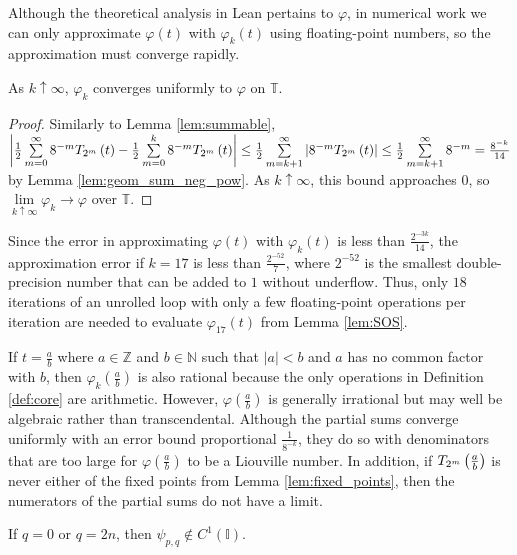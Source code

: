 Although the theoretical analysis in Lean pertains to $\varphi$, in numerical work we can only approximate $\varphi\left(t\right)$ with $\varphi_k\left(t\right)$ using floating-point numbers, so the approximation must converge rapidly.
\begin{lemma}[]
  \label{lem:limit}
  As $k \uparrow \infty$, $\varphi_k$ converges uniformly to $\varphi$ on $\mathbb{T}$.
\end{lemma}
\begin{proof}
  Similarly to Lemma \ref{lem:summable}, $\left|\halfsum{0}{\infty}{t} - \halfsum{0}{k}{t}\right| \leq \frac{1}{2} \sum\limits_{m = k + 1}^\infty \left|8^{-m}\TT[t]{m}\right| \leq \frac{1}{2} \sum\limits_{m = k + 1}^\infty 8^{-m} = \offset$ by Lemma \ref{lem:geom_sum_neg_pow}. As $k \uparrow \infty$, this bound approaches $0$, so $\lim\limits_{k \uparrow \infty}\varphi_k \rightarrow \varphi$ over $\mathbb{T}$.
\end{proof}
\begin{remark*}
Since the error in approximating $\varphi\left(t\right)$ with $\varphi_k\left(t\right)$ is less than $\frac{2^{-3k}}{14}$, the approximation error if $k = 17$ is less than $\frac{2^{-52}}{7}$, where $2^{-52}$ is the smallest double-precision number that can be added to $1$ without underflow. Thus, only $18$ iterations of an unrolled loop with only a few floating-point operations per iteration are needed to evaluate $\varphi_{17}\left(t\right)$ from Lemma \ref{lem:SOS}.
\end{remark*}
\begin{remark*}
  If $t = \frac{a}{b}$ where $a \in \mathbb{Z}$ and $b \in \mathbb{N}$ such that $\left|a\right| < b$ and $a$ has no common factor with $b$, then $\varphi_k\left(\frac{a}{b}\right)$ is also rational because the only operations in Definition \ref{def:core} are arithmetic. However, $\varphi\left(\frac{a}{b}\right)$ is generally irrational but may well be algebraic rather than transcendental. Although the partial sums converge uniformly with an error bound proportional $\frac{1}{8^{-k}}$, they do so with denominators that are too large for $\varphi\left(\frac{a}{b}\right)$ to be a Liouville number. In addition, if $\TT[\frac{a}{b}]{m}$ is never either of the fixed points from Lemma \ref{lem:fixed_points}, then the numerators of the partial sums do not have a limit.
\end{remark*}


\begin{proposition}[]
  \label{prop:q=0}
  If $q = 0$ or $q = 2n$, then $\psi_{p,q} \notin C^1\left(\mathbb{I}\right)$.
\end{proposition}
  
